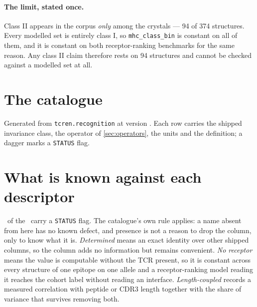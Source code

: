 \documentclass[11pt,a4paper]{article}
\newcommand{\dsc}[1]{\texttt{#1}}
\begin{document}
\paragraph{The limit, stated once.} Class II appears in the corpus \emph{only} among the crystals ---
94 of 374 structures. Every modelled set is entirely class I, so \dsc{mhc\_class\_bin} is constant
on all of them, and it is constant on both receptor-ranking benchmarks for the same reason. Any
class II claim therefore rests on 94 structures and cannot be checked against a modelled set at all.

\section{The catalogue}
\label{sec:catalogue}

Generated from \texttt{tcren.recognition} at version \tcrenVersion. Each row carries the shipped
invariance class, the operator of \cref{sec:operators}, the units and the definition; a dagger marks
a \texttt{STATUS} flag.



\section{What is known against each descriptor}
\label{sec:status}

\nFlagged\ of the \nDesc\ carry a \texttt{STATUS} flag. The catalogue's own rule applies: a name
absent from here has no known defect, and presence is not a reason to drop the column, only to know
what it is. \emph{Determined} means an exact identity over other shipped columns, so the column adds
no information but remains convenient. \emph{No receptor} means the value is computable without the
TCR present, so it is constant across every structure of one epitope on one allele and a
receptor-ranking model reading it reaches the cohort label without reading an interface.
\emph{Length-coupled} records a measured correlation with peptide or CDR3 length together with the
share of variance that survives removing both.


\end{document}
